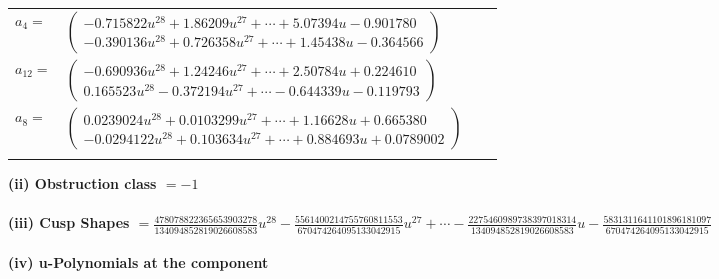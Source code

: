 \documentclass[1p]{elsarticle_modified}
\theoremstyle{definition}
\begin{document}
\begin{tabular}{m{7pt} m{180pt} m{7pt} m{180pt} }
\flushright $a_{4}=$&$\begin{pmatrix}-0.715822 u^{28}+1.86209 u^{27}+\cdots+5.07394 u-0.901780\\-0.390136 u^{28}+0.726358 u^{27}+\cdots+1.45438 u-0.364566\end{pmatrix}$ \\
\flushright $a_{12}=$&$\begin{pmatrix}-0.690936 u^{28}+1.24246 u^{27}+\cdots+2.50784 u+0.224610\\0.165523 u^{28}-0.372194 u^{27}+\cdots-0.644339 u-0.119793\end{pmatrix}$ \\
\flushright $a_{8}=$&$\begin{pmatrix}0.0239024 u^{28}+0.0103299 u^{27}+\cdots+1.16628 u+0.665380\\-0.0294122 u^{28}+0.103634 u^{27}+\cdots+0.884693 u+0.0789002\end{pmatrix}$\\&\end{tabular}
\flushleft \textbf{(ii) Obstruction class $= -1$}\\~\\
\flushleft \textbf{(iii) Cusp Shapes $= \frac{478078822365653903278}{134094852819026608583} u^{28}-\frac{5561400214755760811553}{670474264095133042915} u^{27}+\cdots-\frac{2275460989738397018314}{134094852819026608583} u-\frac{5831311641101896181097}{670474264095133042915}$}\\~\\
\newpage\renewcommand{\arraystretch}{1}
\flushleft \textbf{(iv) u-Polynomials at the component}\newline \\
\end{document}
